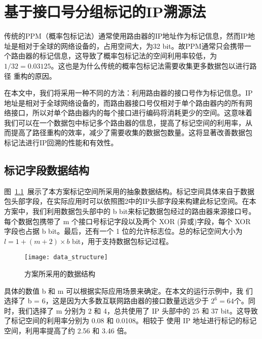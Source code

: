 \chapter{基于接口号分组标记的IP溯源法}

传统的PPM（概率包标记法）通常使用路由器的IP地址作为标记信息，然而IP地
址是相对于全球的网络设备的，占用空间大，为32 bit。故PPM通常只会携带一
个路由器的标记信息，这导致了概率包标记法的空间利用率较低，为$1/32 = 
0.03125$。这也是为什么传统的概率包标记法需要收集更多数据包以进行路径
重构的原因。

在本文中，我们将采用一种不同的方法：利用路由器的接口号作为标记信息。IP
地址是相对于全球网络设备的，而路由器接口号仅相对于单个路由器内的所有网
络接口，所以对单个路由器内的每个接口进行编码将消耗更少的空间。这意味着
我们可以在一个数据包中标记多个路由器的信息，提高了标记空间的利用率，从
而提高了路径重构的效率，减少了需要收集的数据包数量。这将显著改善数据包
标记法进行IP回溯的性能和有效性。

\section{标记字段数据结构}

图~\ref{fig:data_structure}~展示了本方案标记空间所采用的抽象数据结构。标记空间具体来自于数据包头部字段，在实际应用时可以依照图2中的IP头部字段来构建此标记空间。在本方案中，我们利用数据包头部中的 b bit来标记数据包经过的路由器来源接口号。每个数据包携带了 m 个接口号标记字段以及两个 XOR (异或)字段，每个 XOR 字段也占据 b bit。最后，还有一个 1 位的允许标志位。总的标记空间大小为 $l = 1 + (m + 2) \times b$ bit，用于支持数据包标记过程。
\begin{figure}[htbp]
  \centering
  \texttt{[image: data\_structure]}
  \caption{方案所采用的数据结构}
  \label{fig:data_structure}
\end{figure} 

具体的数值 b 和 m 可以根据实际应用场景来确定。在本文的运行示例中，我
们选择了 b = 6，这是因为大多数互联网路由器的接口数量远远少于 $2^6 =
64$个。同时，我们选择了 m 分别为 2 和 4，总共使用了 IP 头部中的 25
和 37 bit。这导致了标记空间的利用率分别为 0.08 和 0.0108。相较于
使用 IP 地址进行标记的标记空间，利用率提高了约 2.56 和 3.46 倍。
% 


